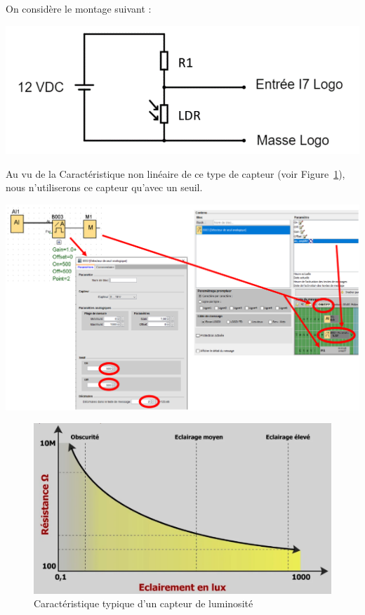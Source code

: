 \documentclass[11pt]{article}
\begin{document}
\begin{UPSTIactivite}
	On considère le montage suivant : 
	\begin{center}
		\includegraphics[width=.7\textwidth]{images/TP04-montageLuminosite.png}
	\end{center}
	Au vu de la Caractéristique non linéaire de ce type de capteur (voir Figure~\ref{fig:caracLumi}), nous n'utiliserons ce capteur qu'avec un seuil. 
	\begin{center}
		\includegraphics[width=.9\textwidth]{images/TP04-programmeLumi.png}		
	\end{center}
\end{UPSTIactivite}

\begin{figure}
	\centering
	\includegraphics[height=.2\textheight]{images/TP04-caracCapteurLumi.png}
	\caption{Caractéristique typique d'un capteur de luminosité}
	\label{fig:caracLumi}
\end{figure}
\end{document}
